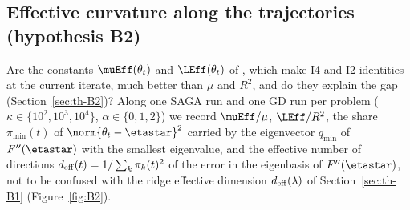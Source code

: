 \subsection{Effective curvature along the trajectories (hypothesis B2)}\label{sec:exp-B2}

Are the constants $\muEff(\theta_t)$ and $\LEff(\theta_t)$ of , which make I4 and I2 identities
at the current iterate, much better than $\mu$ and $R^2$, and do they explain the gap (Section~\ref{sec:th-B2})? Along one
SAGA run and one GD run per problem ($\kappa\in\{10^2,10^3,10^4\}$, $\alpha\in\{0,1,2\}$) we record $\muEff/\mu$, $\LEff/R^2$,
the share $\pi_{\min}(t)$ of $\norm{\theta_t-\etastar}^2$ carried by the eigenvector $q_{\min}$ of $F''(\etastar)$ with the
smallest eigenvalue, and the effective number of directions $d_{\rm eff}(t)=1/\sum_k\pi_k(t)^2$ of the error in the
eigenbasis of $F''(\etastar)$, not to be confused with the ridge effective dimension $d_{\rm eff}(\lambda)$ of
Section~\ref{sec:th-B1} (Figure~\ref{fig:B2}).

